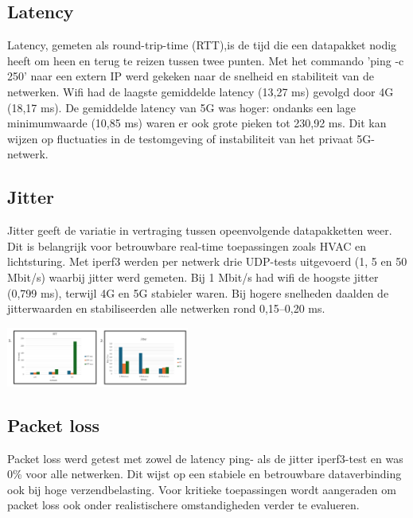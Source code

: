 \documentclass[a0,portrait]{hogent-poster}
\begin{document}
\begin{multicols}{2}
\begin{multicols}{2}
\subsection*{Latency}

Latency, gemeten als round-trip-time (RTT),is de tijd die een datapakket nodig heeft om heen en terug te reizen tussen twee punten. Met het commando ’ping -c 250’ naar een extern IP werd gekeken naar de snelheid en stabiliteit van de netwerken. Wifi had de laagste gemiddelde latency (13,27 ms) gevolgd door 4G (18,17 ms). De gemiddelde latency van 5G was hoger: ondanks een lage minimumwaarde (10,85 ms) waren er ook grote pieken tot 230,92 ms. Dit kan wijzen op fluctuaties in de testomgeving of instabiliteit van het privaat 5G-netwerk.
\subsection*{Jitter}

Jitter geeft de variatie in vertraging tussen opeenvolgende datapakketten weer. Dit is belangrijk voor betrouwbare real-time toepassingen zoals HVAC en lichtsturing. Met iperf3 werden per netwerk drie UDP-tests uitgevoerd (1, 5 en 50 Mbit/s) waarbij jitter werd gemeten. Bij 1 Mbit/s had wifi de hoogste jitter (0,799 ms), terwijl 4G en 5G stabieler waren. Bij hogere snelheden daalden de jitterwaarden en stabiliseerden alle netwerken rond 0,15–0,20 ms.\newline
\end{multicols}
\begin{center}
    \captionsetup{type=figure}
    \includegraphics[width=0.45\textwidth]{../graphics/Latency-Jitter-grafiek.png}
\end{center}
\subsection*{Packet loss}

Packet loss werd getest met zowel de latency ping- als de jitter iperf3-test en was 0\% voor alle netwerken. Dit wijst op een stabiele en betrouwbare dataverbinding ook bij hoge verzendbelasting. Voor kritieke toepassingen wordt aangeraden om packet loss ook onder realistischere omstandigheden verder te evalueren.


\end{multicols}
\end{document}
